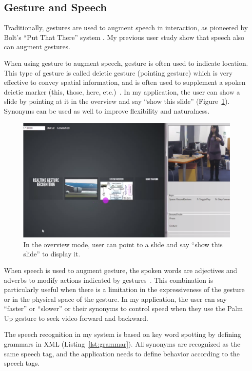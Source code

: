 \subsection{Gesture and Speech}
Traditionally, gestures are used to augment speech in interaction, as pioneered
by Bolt's ``Put That There'' system \cite{Bolt80}. My previous user study
\cite{yin10thesis} show that speech also can augment gestures.

When using gesture to augment speech, gesture is often used to indicate
location. This type of gesture is called deictic gesture (pointing gesture)
which is very effective to convey spatial information, and is often used to
supplement a spoken deictic marker (this, those, here, etc.)~\cite{oviatt97,
tse07}.
In my application, the user can show a slide by pointing at it in the overview and
say ``show this slide'' (Figure~\ref{fig:point-overview}). Synonyms can be used
as well to improve flexibility and naturalness.

\begin{figure}[tbh]
\centering
\includegraphics[width=\columnwidth]{figures/point_overview.PNG}
\caption{In the overview mode, user can point to a slide and say ``show this
slide'' to display it.}
\label{fig:point-overview}
\end{figure}

When speech is used to augment gesture, the spoken words are adjectives and
adverbs to modify actions indicated by gestures~\cite{yin10thesis}. This
combination is particularly useful when there is a limitation in the
expressiveness of the gesture or in the physical space of the gesture. In my
application, the user can say ``faster'' or ``slower'' or their synonyms to
control speed when they use the Palm Up gesture to seek video forward and
backward.

The speech recognition in my system is based on key word spotting by defining
grammars in XML (Listing~\ref{lst:grammar}). All synonyms are recognized as the same speech
tag, and the application needs to define behavior according to the speech tags. 

